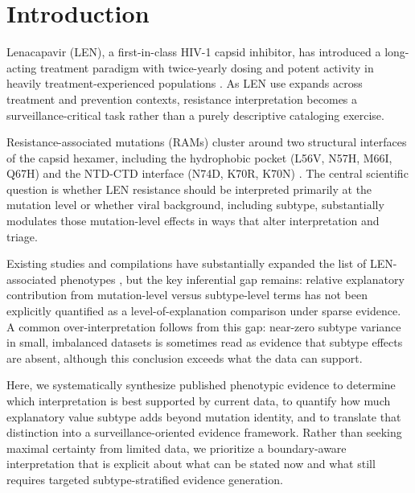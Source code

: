 \documentclass[preprint]{elsarticle}
\begin{document}
\linenumbers

\section{Introduction}

Lenacapavir (LEN), a first-in-class HIV-1 capsid inhibitor, has introduced a long-acting treatment paradigm with twice-yearly dosing and potent activity in heavily treatment-experienced populations \cite{Link2020,Segal2022}. As LEN use expands across treatment and prevention contexts, resistance interpretation becomes a surveillance-critical task rather than a purely descriptive cataloging exercise.

Resistance-associated mutations (RAMs) cluster around two structural interfaces of the capsid hexamer, including the hydrophobic pocket (L56V, N57H, M66I, Q67H) and the NTD-CTD interface (N74D, K70R, K70N) \cite{Yant2022,Margot2023}. The central scientific question is whether LEN resistance should be interpreted primarily at the mutation level or whether viral background, including subtype, substantially modulates those mutation-level effects in ways that alter interpretation and triage.

Existing studies and compilations have substantially expanded the list of LEN-associated phenotypes \cite{Andreatta2024}, but the key inferential gap remains: relative explanatory contribution from mutation-level versus subtype-level terms has not been explicitly quantified as a level-of-explanation comparison under sparse evidence. A common over-interpretation follows from this gap: near-zero subtype variance in small, imbalanced datasets is sometimes read as evidence that subtype effects are absent, although this conclusion exceeds what the data can support.

Here, we systematically synthesize published phenotypic evidence to determine which interpretation is best supported by current data, to quantify how much explanatory value subtype adds beyond mutation identity, and to translate that distinction into a surveillance-oriented evidence framework. Rather than seeking maximal certainty from limited data, we prioritize a boundary-aware interpretation that is explicit about what can be stated now and what still requires targeted subtype-stratified evidence generation.

\end{document}
